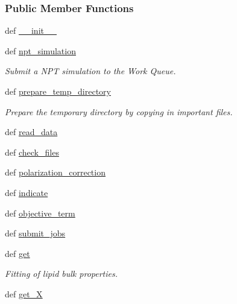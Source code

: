 \subsubsection*{Public Member Functions}
\begin{DoxyCompactItemize}
\item 
def \hyperlink{classforcebalance_1_1gmxio_1_1Lipid__GMX_afbebb0f60af23428e2554d63a55c9f84}{\-\_\-\-\_\-init\-\_\-\-\_\-}
\item 
def \hyperlink{classforcebalance_1_1gmxio_1_1Lipid__GMX_a96b5ec8ce3421a14841f76ac21b55958}{npt\-\_\-simulation}
\begin{DoxyCompactList}\small\item\em Submit a N\-P\-T simulation to the Work Queue. \end{DoxyCompactList}\item 
def \hyperlink{classforcebalance_1_1lipid_1_1Lipid_ada28e39f54dc19403da5bb5aa97321d8}{prepare\-\_\-temp\-\_\-directory}
\begin{DoxyCompactList}\small\item\em Prepare the temporary directory by copying in important files. \end{DoxyCompactList}\item 
def \hyperlink{classforcebalance_1_1lipid_1_1Lipid_acd7058d950b65b20a25a97ebc6ad5973}{read\-\_\-data}
\item 
def \hyperlink{classforcebalance_1_1lipid_1_1Lipid_a37720af9570784f8ecd47ee9a76ba93b}{check\-\_\-files}
\item 
def \hyperlink{classforcebalance_1_1lipid_1_1Lipid_a95a7bd274403cfbc71cfed24d3939112}{polarization\-\_\-correction}
\item 
def \hyperlink{classforcebalance_1_1lipid_1_1Lipid_adf7931b8fae0e40b02ff7b79ff7433f0}{indicate}
\item 
def \hyperlink{classforcebalance_1_1lipid_1_1Lipid_ae7c62e18f1281543ee8a627261406626}{objective\-\_\-term}
\item 
def \hyperlink{classforcebalance_1_1lipid_1_1Lipid_a245fcbc89c3f2f83200843a8d2578423}{submit\-\_\-jobs}
\item 
def \hyperlink{classforcebalance_1_1lipid_1_1Lipid_acfd2b5c694d9617343ba39320ecd1226}{get}
\begin{DoxyCompactList}\small\item\em Fitting of lipid bulk properties. \end{DoxyCompactList}\item 
def \hyperlink{classforcebalance_1_1target_1_1Target_a606dd136f195c267c05a2455405e5949}{get\-\_\-\-X}

\end{DoxyCompactItemize}
